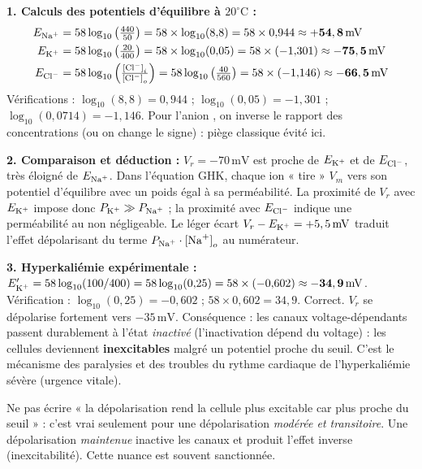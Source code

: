 \documentclass[11pt]{article}
\begin{document}
\begin{corrige}
\textbf{1. Calculs des potentiels d'équilibre à $20^\circ\text{C}$ :}
\begin{align*}
E_{\ce{Na+}} &= 58 \log_{10}\left(\tfrac{440}{50}\right) = 58 \times \log_{10}(8{,}8) = 58 \times 0{,}944 \approx \mathbf{+54,8\,\text{mV}} \\
E_{\ce{K+}} &= 58 \log_{10}\left(\tfrac{20}{400}\right) = 58 \times \log_{10}(0{,}05) = 58 \times (-1{,}301) \approx \mathbf{-75,5\,\text{mV}} \\
E_{\ce{Cl-}} &= 58 \log_{10}\left(\tfrac{{[\ce{Cl-}]}_{i}}{{[\ce{Cl-}]}_{o}}\right) = 58 \log_{10}\left(\tfrac{40}{560}\right) = 58 \times (-1{,}146) \approx \mathbf{-66,5\,\text{mV}}
\end{align*}
Vérifications : $\log_{10}(8{,}8) = 0{,}944$ ; $\log_{10}(0{,}05) = -1{,}301$ ; $\log_{10}(0{,}0714) = -1{,}146$. Pour l'anion , on inverse le rapport des concentrations (ou on change le signe) : piège classique évité ici.

\textbf{2. Comparaison et déduction :} $V_r = -70\,\text{mV}$ est proche de $E_{\ce{K+}}$ et de $E_{\ce{Cl-}}$, très éloigné de $E_{\ce{Na+}}$. Dans l'équation GHK, chaque ion « tire » $V_m$ vers son potentiel d'équilibre avec un poids égal à sa perméabilité. La proximité de $V_r$ avec $E_{\ce{K+}}$ impose donc $P_{\ce{K+}} \gg P_{\ce{Na+}}$ ; la proximité avec $E_{\ce{Cl-}}$ indique une perméabilité au  non négligeable. Le léger écart $V_r - E_{\ce{K+}} = +5,5\,\text{mV}$ traduit l'effet dépolarisant du terme $P_{\ce{Na+}} \cdot {[\ce{Na+}]}_{o}$ au numérateur.

\textbf{3. Hyperkaliémie expérimentale :} $E_{\ce{K+}}' = 58 \log_{10}(100/400) = 58 \log_{10}(0{,}25) = 58 \times (-0{,}602) \approx \mathbf{-34,9\,\text{mV}}$.
Vérification : $\log_{10}(0{,}25) = -0{,}602$ ; $58 \times 0{,}602 = 34{,}9$. Correct.
$V_r$ se dépolarise fortement vers $-35\,\text{mV}$. Conséquence : les canaux  voltage-dépendants passent durablement à l'état \emph{inactivé} (l'inactivation dépend du voltage) : les cellules deviennent \textbf{inexcitables} malgré un potentiel proche du seuil. C'est le mécanisme des paralysies et des troubles du rythme cardiaque de l'hyperkaliémie sévère (urgence vitale).

\begin{attention}
Ne pas écrire « la dépolarisation rend la cellule plus excitable car plus proche du seuil » : c'est vrai seulement pour une dépolarisation \emph{modérée et transitoire}. Une dépolarisation \emph{maintenue} inactive les canaux  et produit l'effet inverse (inexcitabilité). Cette nuance est souvent sanctionnée.
\end{attention}
\end{corrige}
\end{document}
